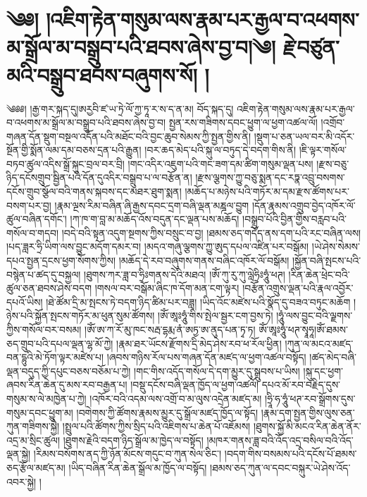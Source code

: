 \chapter{༄༅། །འཇིག་རྟེན་གསུམ་ལས་རྣམ་པར་རྒྱལ་བ་འཕགས་མ་སྒྲོལ་མ་བསྒྲུབ་པའི་ཐབས་ཞེས་བྱ་བ།༄། རྗེ་བཙུན་མའི་བསྒྲུབ་ཐབས་བཞུགས་སོ། ། }༄༅༅། །རྒྱ་གར་སྐད་དུ།ཨརྱབི་ཛ་ཡ་ཏྲེ་ལོ་ཀྱ་ཏཱ་ར་ས་ད་ན་མ། བོད་སྐད་དུ། འཇིག་རྟེན་གསུམ་ལས་རྣམ་པར་རྒྱལ་བ་འཕགས་མ་སྒྲོལ་མ་བསྒྲུབ་པའི་ཐབས་ཞེས་བྱ་བ། སྤྱན་རས་གཟིགས་དབང་ཕྱུག་ལ་ཕྱག་འཚལ་ལོ། །འགྲོབ་གཞན་དོན་སྡུག་བསྔལ་འདོན་པའི་མཐོང་བའི་བྱང་ཆུབ་སེམས་ཀྱི་སྤྱན་གྱིས་ནི། །སྡུག་པ་ཅན་ཡལ་བར་མི་འདོར་སྔོན་གྱི་སྨོན་ལམ་དམ་བཅས་དྲན་པའི་རྒྱུན། །བར་ཆད་མེད་པའི་སྐུ་ལ་བཏུད་དེ་བདག་གིས་ནི། །ཇི་ལྟར་གསོལ་བཏབ་ཚུལ་འདིས་སྒྲོ་སྐུང་བྲལ་བར་བྲི། །གང་འདིར་འཇུག་པའི་གང་ཟག་དམ་ཚིག་གསུམ་ལྡན་པས། །རྫས་བཅུ་ཉིད་དངོསགྲུབ་སྦྱིན་པའི་དོན་དུའདིར་བསྒྲུབ་པ་ལ་བརྩོན་ན། །རྫས་ལྕགས་ཀྱུ་བཅུ་སྨན་དང་རཏྣ་འབྲུ་བསགས་དངོས་གྲུབ་སྩོལ་བའི་གནས་སྐབས་དང་མཐར་ཐུག་སྨན། །མཆོད་པ་མཉེས་པའི་གཏོར་མ་དམ་རྫས་ཚོགས་པར་བསག་པར་བྱ། །རྣམ་ལྔས་རིམ་བཞིན་ཞི་རྒྱས་དབང་དྲག་བཞི་ལྡན་མཎྜལ་བྱུག །དོན་རྣམས་འགྲུབ་བྱེད་འཁོར་ལོ་ཚུལ་བཞིན་དགོང་། །ཀ་ཁ་ག་བླ་མ་མཆོད་འོས་བདུན་དང་ལྡན་པས་མཆོད། །བསྒྲུབ་པོའི་བྱིན་གྱིས་བརླབ་པའི་གསོལ་བ་གདབ། །བདེ་བའི་སྟན་འདུག་སྔགས་ཀྱིས་བསྲུང་བ་བྱ། །ཐམས་ཅད་གདོད་ནས་དག་པའི་རང་བཞིན་ལས། །པད་ཟླར་ཧྲི་ཡིག་ལས་བྱུང་མདོག་དམར་བ། །མདའ་གཞུ་ལྕགས་ཀྱུ་ཨུད་དཔལ་འཛིན་པར་བསྒོམ། །ཡེ་ཤེས་སེམས་དཔའ་སྤྱན་དྲངས་ཕྱག་སོགས་ཀྱིས། །མཆོད་དེ་རབ་བཞུགས་གནས་བཞིང་འཁོར་ལོ་བསྒོམ། །སྐྱོན་བཞི་སྤངས་པའི་བསྙེན་པ་ཚད་དུ་བསྐྱལ། །ཐུགས་ཀར་ཟླ་བ་ཧྲིཿགནས་དེའི་མཐའ། །ཨོཾ་ཀུ་རུ་ཀུ་ལླེཧྲིཿཧཱུཾ་ཕཊ། །རིན་ཆེན་ཕྲེང་བའི་ཚུལ་ཅན་ཐབས་ཤེས་བདག །གསལ་བར་བསྒོམ་ཞིང་ཁ་དོག་མན་ངག་ལྟར། །བརྩོན་འགྲུས་ལྡན་པའི་རྣལ་འབྱོར་དཔའོ་ཡིས། །ཐེ་ཚོམ་དྲི་མ་སྤངས་ཏེ་བདག་ཉིད་ཚིམ་པར་བཟླ། །ཡིད་འོང་མཛེས་པའི་སྣོད་དུ་བཟའ་བཏུང་མཆོག །ཉེས་པའི་སྐྱོན་སྤངས་གཏོར་མ་ཕུན་སུམ་ཚོགས། །ཨོཾ་ཨཱཿཧཱུཾ་གིས་སྤེལ་སྦྱར་ངག་བྱས་ཏེ། །ཧཱུཾ་ལས་བྱུང་བའི་ལྗགས་ཀྱིས་གསོལ་བར་བསམ། །ཨོཾ་ཨ་ཀ་རོ་མུ་ཁང་སརྦ་དྷརྨ་ནཾ་ཨཏྱ་ཨ་ནུད་པན་ཏྭ་ཏ། ཨོཾ་ཨཱཿཧཱུཾ་ཕཊ་སྭཱཧཱ།ཨོཾ་ཐམས་ཅད་གྲུབ་པའི་དཔལ་ལྡན་ལྷ་མོ་ཀྱེ། །རྣམ་ཐར་ཡོངས་རྫོགས་དྲི་མེད་ཤེས་རབ་ཕ་རོལ་ཕྱིན། །ཀུན་ལ་མངའ་མཛད་བན་དྷུའི་མེ་ཏོག་ལྟར་མཛེས་པ། །ཞབས་གཉིས་རོལ་པས་གཞན་དོན་མཛད་ལ་ཕྱག་འཚལ་བསྟོད། །ཚད་མེད་བཞི་ལྡན་བདུད་ཀྱི་དཔུང་བཅས་བཅོམ་པ་ཀྱེ། །གང་གིས་འདོད་གསོལ་དེ་དག་མྱུར་དུ་སྒྲུབས་པ་ཡིས། །སྐུ་དང་ཕྱག་ཞབས་རིན་ཆེན་དུ་མས་རབ་བརྒྱན་པ། །བསྡུ་དངོས་བཞི་ལྡན་ཁྱོད་ལ་ཕྱག་འཚལོ། དཔའ་མོ་རབ་བརྗིད་དུས་གསུམ་ས་ལེ་མཁྱེན་པ་ཀྱེ། །འཁོར་བའི་འདམ་ལས་འགྲོ་བ་མ་ལུས་འདྲེན་མཛད་མ། །ཧྲཱི་ཧ་ཧཱུཾ་ཕཊ་རབ་སྒྲོགས་དུས་གསུམ་དབང་ཕྱུག་མ། །བགེགས་ཀྱི་ཚོགས་རྣམས་མྱུར་དུ་སྒྲོལ་མཛད་ཁྱོད་ལ་སྟོད། །རྣམ་དག་སྤྱན་གྱིས་ལུས་ཅན་ཀུན་གཟིགས་སྐྱཻ། །སྤྲུལ་པའི་ཚོགས་ཀྱིས་སྲིད་པའི་འཇིགས་པ་ཆེན་པོ་འཇོམས། །ཐུགས་སྐྱོ་མི་མངའ་རིན་ཆེན་ནོར་འདྲ་མ་སྲིང་ཚུལ། །ཐུགས་རྗེའི་བདག་ཉིད་སྒྲོལ་མ་ཁྱེད་ལ་བསྟོད། །མཁར་གནས་ཟླ་བའི་འོད་འདྲ་བསིལ་བའི་འོད་ལྡན་སྐྱེ། །རིམས་བསོགས་ནད་ཀྱི་ཉོན་མོངས་གདུང་བ་ཀུན་སེལ་ཅིང་། །བདག་གིས་བསམས་པའི་དངོས་པོ་ཐམས་ཅད་རྩོལ་མཛད་མ། །ཡིད་བཞིན་རིན་ཆེན་སྒྲོལ་མ་ཁྱོད་ལ་བསྟོད། །ཐམས་ཅད་ཀུན་ལ་དབང་བསྐུར་ཡེ་ཤེས་འོད་འབར་སྐྱེ། །
